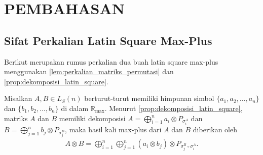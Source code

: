 \chapter{PEMBAHASAN}

\section{Sifat Perkalian Latin Square Max-Plus}
Berikut merupakan rumus perkalian dua buah latin square max-plus menggunakan \autoref{lem:perkalian_matriks_permutasi} dan \autoref{prop:dekomposisi_latin_square}.
\begin{akibat}\label{cor:perkalian_latin_square}
  Misalkan $A, B \in L_S(n)$ berturut-turut memiliki himpunan simbol $\{a_1, a_2, \ldots, a_n\}$ dan $\{b_1, b_2, \ldots, b_n\}$ di dalam $\mathbb{R}_{\max}$. Menurut \autoref{prop:dekomposisi_latin_square}, matriks $A$ dan $B$ memiliki dekomposisi $A = \bigoplus_{i=1}^{n} a_i \otimes P_{\sigma_i^A}$ dan $B = \bigoplus_{j=1}^{n} b_j \otimes P_{\sigma_j^B}$, maka hasil kali max-plus dari $A$ dan $B$ diberikan oleh
  \begin{align}\label{eq:perkalian_latin_square_maxplus}
    A \otimes B = \bigoplus_{i=1}^{n} \bigoplus_{j=1}^{n} (a_i \otimes b_j) \otimes P_{\sigma_j^B \circ \sigma_i^A}.
  \end{align}
\end{akibat}

